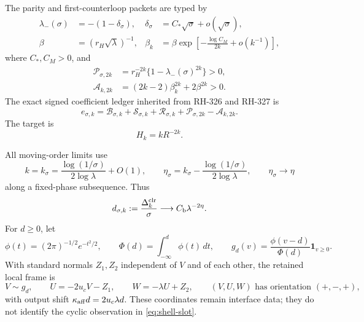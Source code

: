 \documentclass[11pt]{article}
\theoremstyle{remark}
\newcommand{\cA}{\mathcal A}
\newcommand{\cB}{\mathcal B}
\newcommand{\cP}{\mathcal P}
\newcommand{\cR}{\mathcal R}
\newcommand{\cS}{\mathcal S}
\begin{document}
The parity and first-counterloop packets are typed by
\begin{align}
 \lambda_-(\sigma)&=-(1-\delta_\sigma),
 &\delta_\sigma&=C_*\sqrt\sigma+o(\sqrt\sigma),
 \label{eq:parity-type}\\
 \beta&=(r_H\sqrt\lambda)^{-1},
 &\beta_k&=\beta\exp\left[-\frac{\log C_M}{2k}+o(k^{-1})\right],
 \label{eq:alias-type}
\end{align}
where $C_*,C_M>0$, and
\begin{align}
 \cP_{\sigma,2k}
 &=r_H^{-2k}\{1-\lambda_-(\sigma)^{2k}\}>0,
 \label{eq:parity-packet}\\
 \cA_{k,2k}
 &=(2k-2)\beta_k^{2k}+2\beta^{2k}>0.
 \label{eq:alias-packet}
\end{align}
The exact signed coefficient ledger inherited from RH-326 and RH-327 is
\begin{equation}
 \boxed{
 e_{\sigma,k}
 =\cB_{\sigma,k}+\cS_{\sigma,k}+\cR_{\sigma,k}
  +\cP_{\sigma,2k}-\cA_{k,2k}.}
 \label{eq:exact-ledger}
\end{equation}
The target is
\begin{equation}
 H_k=kR^{-2k}.
 \label{eq:target}
\end{equation}

All moving-order limits use
\begin{equation}
 k=k_\sigma
 =\frac{\log(1/\sigma)}{2\log\lambda}+O(1),
 \qquad
 \eta_\sigma=k_\sigma-
 \frac{\log(1/\sigma)}{2\log\lambda},
 \qquad
 \eta_\sigma\longrightarrow\eta
 \label{eq:clock}
\end{equation}
along a fixed-phase subsequence.  Thus
\begin{equation}
 d_{\sigma,k}:=\frac{\Delta_k^{\rm clr}}{\sigma}
 \longrightarrow C_{\rm b}\lambda^{-2\eta}.
 \label{eq:clearance-phase}
\end{equation}
For $d\ge0$, let
\begin{equation}
 \phi(t)=(2\pi)^{-1/2}e^{-t^2/2},
 \qquad
 \Phi(d)=\int_{-\infty}^d\phi(t)\,dt,
 \qquad
 g_d(v)=\frac{\phi(v-d)}{\Phi(d)}\mathbf1_{v\ge0}.
 \label{eq:entrance-density}
\end{equation}
With standard normals $Z_1,Z_2$ independent of $V$ and of each other, the
retained local frame is
\begin{equation}
 V\sim g_d,
 \qquad U=-2u_cV-Z_1,
 \qquad W=-\lambda U+Z_2,
 \qquad (V,U,W)\text{ has orientation }(+,-,+),
 \label{eq:frame}
\end{equation}
with output shift $\kappa_{\rm aff}d=2u_c\lambda d$.  These coordinates
remain interface data; they do not identify the cyclic observation in
\eqref{eq:shell-slot}.
\end{document}
